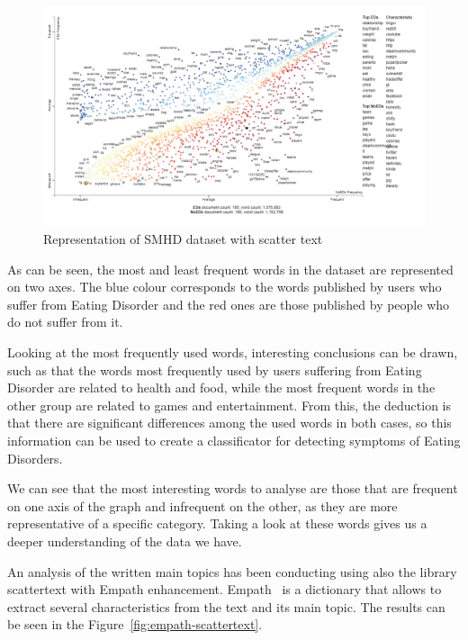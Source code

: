 \begin{figure}[!htp]
    \centering
    \includegraphics[scale=0.7]{img/detection/scattertext.png}
    \caption{Representation of SMHD dataset with scatter text}
    \label{fig:scattertext}
\end{figure}

As can be seen, the most and least frequent words in the dataset are represented on two axes. The blue colour corresponds to the words published by users who suffer from Eating Disorder and the red ones are those published by people who do not suffer from it. 

Looking at the most frequently used words, interesting conclusions can be drawn, such as that the words most frequently used by users suffering from Eating Disorder are related to health and food, while the most frequent words in the other group are related to games and entertainment. From this, the deduction is that there are significant differences among the used words in both cases, so this information can be used to create a classificator for detecting symptoms of Eating Disorders.

We can see that the most interesting words to analyse are those that are frequent on one axis of the graph and infrequent on the other, as they are more representative of a specific category. Taking a look at these words gives us a deeper understanding of the data we have.

An analysis of the written main topics has been conducting using also the library scattertext with Empath enhancement. Empath~\cite{empath} is a dictionary that allows to extract several characteristics from the text and its main topic. The results can be seen in the Figure~\ref{fig:empath-scattertext}.

